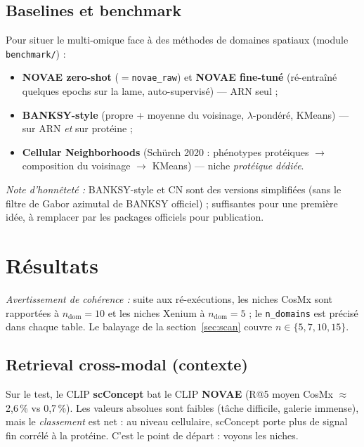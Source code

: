 \documentclass[11pt,a4paper]{article}
\begin{document}
\subsection{Baselines et benchmark}
Pour situer le multi-omique face à des méthodes de domaines spatiaux (module
\texttt{benchmark/}) :
\begin{itemize}[noitemsep]
  \item \textbf{NOVAE zero-shot} ($=$\texttt{novae\_raw}) et \textbf{NOVAE fine-tuné}
        (ré-entraîné quelques epochs sur la lame, auto-supervisé) --- ARN seul ;
  \item \textbf{BANKSY-style} (propre + moyenne du voisinage, $\lambda$-pondéré, KMeans) ---
        sur ARN \emph{et} sur protéine ;
  \item \textbf{Cellular Neighborhoods} (Schürch 2020 : phénotypes protéiques
        $\rightarrow$ composition du voisinage $\rightarrow$ KMeans) --- niche \emph{protéique
        dédiée}.
\end{itemize}
\emph{Note d'honnêteté :} BANKSY-style et CN sont des versions simplifiées (sans le filtre
de Gabor azimutal de BANKSY officiel) ; suffisantes pour une première idée, à remplacer par
les packages officiels pour publication.

\section{Résultats}
\emph{Avertissement de cohérence :} suite aux ré-exécutions, les niches CosMx sont
rapportées à $n_{\text{dom}}{=}10$ et les niches Xenium à $n_{\text{dom}}{=}5$ ; le
\texttt{n\_domains} est précisé dans chaque table. Le balayage de la
section~\ref{sec:scan} couvre $n\in\{5,7,10,15\}$.

\subsection{Retrieval cross-modal (contexte)}
Sur le test, le CLIP \textbf{scConcept} bat le CLIP \textbf{NOVAE} (R@5 moyen CosMx
$\approx$2{,}6\,\% vs 0{,}7\,\%). Les valeurs absolues sont faibles (tâche difficile,
galerie immense), mais le \emph{classement} est net : au niveau cellulaire, scConcept porte
plus de signal fin corrélé à la protéine. C'est le point de départ : voyons les niches.
\end{document}
